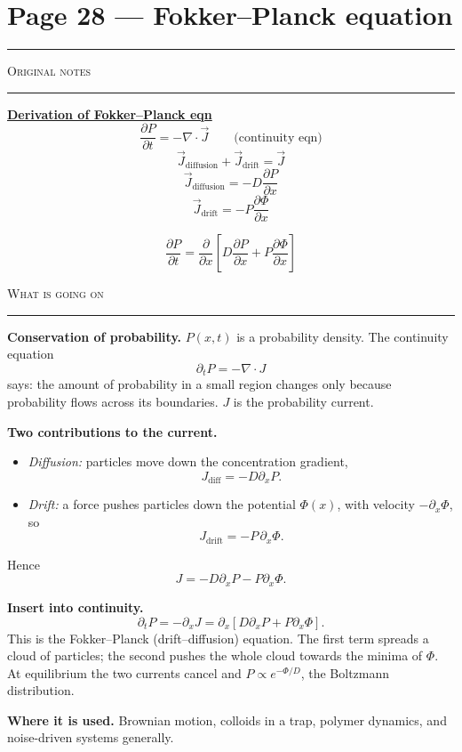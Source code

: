 \documentclass[10pt,a4paper]{article}
\newcommand{\pairpage}[3]{%
  \clearpage
  \section*{\normalsize Page #1}
  \vspace{-0.9em}
  {\color{black!35}\rule{\linewidth}{0.4pt}}\par\vspace{0.2em}
  \noindent
  \begin{minipage}[t]{0.473\textwidth}
    {\scriptsize\textsc{Original notes}}\par\vspace{0.15em}
    {\color{black!25}\rule{\linewidth}{0.3pt}}\par\vspace{0.2em}
    #2
  \end{minipage}%
  \hfill
  \begin{minipage}[t]{0.473\textwidth}
    {\scriptsize\textsc{What is going on}}\par\vspace{0.15em}
    {\color{black!25}\rule{\linewidth}{0.3pt}}\par\vspace{0.2em}
    #3
  \end{minipage}%
}
\begin{document}
\pairpage{28 --- Fokker--Planck equation}{%
\textbf{\underline{Derivation of Fokker--Planck eqn}}
\[
\frac{\partial P}{\partial t}=-\nabla\cdot\vec J
\qquad\text{(continuity eqn)}
\]
\[
\vec J_{\text{diffusion}}+\vec J_{\text{drift}}=\vec J
\]
\[
\vec J_{\text{diffusion}}
=-D\frac{\partial P}{\partial x}
\]
\[
\vec J_{\text{drift}}
=-P\frac{\partial\Phi}{\partial x}
\]
\begin{handbox}
\[
\frac{\partial P}{\partial t}
=\frac{\partial}{\partial x}
\left[D\frac{\partial P}{\partial x}
+P\frac{\partial\Phi}{\partial x}\right]
\]
\end{handbox}
}{%
\textbf{Conservation of probability.} $P(x,t)$ is a probability density.
The continuity equation
\[
\partial_tP=-\nabla\cdot J
\]
says: the amount of probability in a small region changes only because
probability flows across its boundaries. $J$ is the probability current.

\textbf{Two contributions to the current.}
\begin{itemize}
\item \emph{Diffusion:} particles move down the concentration gradient,
\[
J_{\text{diff}}=-D\partial_xP.
\]
\item \emph{Drift:} a force pushes particles down the potential
$\Phi(x)$, with velocity $-\partial_x\Phi$, so
\[
J_{\text{drift}}=-P\,\partial_x\Phi.
\]
\end{itemize}
Hence
\[
J=-D\partial_xP-P\partial_x\Phi.
\]

\textbf{Insert into continuity.}
\[
\partial_tP=-\partial_xJ
=\partial_x\left[D\partial_xP+P\partial_x\Phi\right].
\]
This is the Fokker--Planck (drift--diffusion) equation. The first term
spreads a cloud of particles; the second pushes the whole cloud towards
the minima of $\Phi$. At equilibrium the two currents cancel and
$P\propto e^{-\Phi/D}$, the Boltzmann distribution.

\textbf{Where it is used.} Brownian motion, colloids in a trap,
polymer dynamics, and noise-driven systems generally.
}
\end{document}
